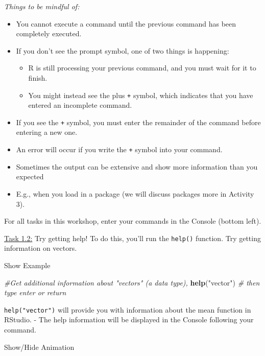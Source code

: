 \documentclass[
]{article}
\newenvironment{Shaded}{\begin{snugshade}}{\end{snugshade}}
\newcommand{\CommentTok}[1]{\textcolor[rgb]{0.56,0.35,0.01}{\textit{#1}}}
\newcommand{\FunctionTok}[1]{\textcolor[rgb]{0.13,0.29,0.53}{\textbf{#1}}}
\newcommand{\NormalTok}[1]{#1}
\newcommand{\StringTok}[1]{\textcolor[rgb]{0.31,0.60,0.02}{#1}}
\begin{document}
\emph{Things to be mindful of:}

\begin{itemize}
\item
  You cannot execute a command until the previous command has been
  completely executed.
\item
  If you don't see the prompt symbol, one of two things is happening:

  \begin{itemize}
  \item
    R is still processing your previous command, and you must wait for
    it to finish.
  \item
    You might instead see the plus \texttt{+} symbol, which indicates
    that you have entered an incomplete command.
  \end{itemize}
\item
  If you see the \texttt{+} symbol, you must enter the remainder of the
  command before entering a new one.
\item
  An error will occur if you write the \texttt{+} symbol into your
  command.
\item
  Sometimes the output can be extensive and show more information than
  you expected
\item
  E.g., when you load in a package (we will discuss packages more in
  Activity 3).
\end{itemize}

For all tasks in this workshop, enter your commands in the Console
(bottom left).

\ul{Task 1.2:} Try getting help! To do this, you'll run the
\texttt{help()} function. Try getting information on vectors.

Show Example

\begin{Shaded}
\begin{Highlighting}[]
\CommentTok{\#Get additional information about "vectors" (a data type), }
\FunctionTok{help}\NormalTok{(}\StringTok{"vector"}\NormalTok{) }\CommentTok{\# then type \textquotesingle{}enter\textquotesingle{} or \textquotesingle{}return\textquotesingle{}}
\end{Highlighting}
\end{Shaded}

\texttt{help("vector")} will provide you with information about the mean
function in RStudio. - The help information will be displayed in the
Console following your command.

Show/Hide Animation
\end{document}
